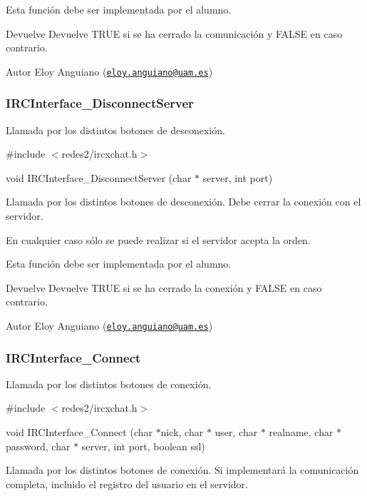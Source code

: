 Esta función debe ser implementada por el alumno.

\begin{DoxyReturn}{Devuelve}
Devuelve T\-R\-U\-E si se ha cerrado la comunicación y F\-A\-L\-S\-E en caso contrario.
\end{DoxyReturn}
\begin{DoxyAuthor}{Autor}
Eloy Anguiano (\href{mailto:eloy.anguiano@uam.es}{\tt eloy.\-anguiano@uam.\-es})
\end{DoxyAuthor}


 \hypertarget{IRCInterface_DisconnectServer}{}\subsubsection{I\-R\-C\-Interface\-\_\-\-Disconnect\-Server}\label{IRCInterface_DisconnectServer}
Llamada por los distintos botones de desconexión.

\#include $<$redes2/ircxchat.\-h$>$

void I\-R\-C\-Interface\-\_\-\-Disconnect\-Server (char $\ast$ server, int port)

Llamada por los distintos botones de desconexión. Debe cerrar la conexión con el servidor.

En cualquier caso sólo se puede realizar si el servidor acepta la orden.

Esta función debe ser implementada por el alumno.

\begin{DoxyReturn}{Devuelve}
Devuelve T\-R\-U\-E si se ha cerrado la conexión y F\-A\-L\-S\-E en caso contrario.
\end{DoxyReturn}
\begin{DoxyAuthor}{Autor}
Eloy Anguiano (\href{mailto:eloy.anguiano@uam.es}{\tt eloy.\-anguiano@uam.\-es})
\end{DoxyAuthor}


 \hypertarget{IRCInterface_Connect}{}\subsubsection{I\-R\-C\-Interface\-\_\-\-Connect}\label{IRCInterface_Connect}
Llamada por los distintos botones de conexión.

\#include $<$redes2/ircxchat.\-h$>$

void I\-R\-C\-Interface\-\_\-\-Connect (char $\ast$nick, char $\ast$ user, char $\ast$ realname, char $\ast$ password, char $\ast$ server, int port, boolean ssl)

Llamada por los distintos botones de conexión. Si implementará la comunicación completa, incluido el registro del usuario en el servidor.

